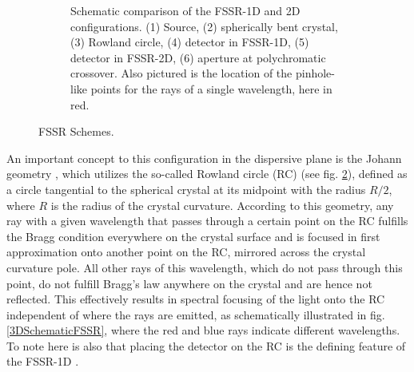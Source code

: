 \begin{figure}
\begin{subfigure}[t]{0.38\textwidth}
		\caption{Schematic comparison of the FSSR-1D and 2D configurations. (1) 
		Source, (2) 
		spherically bent crystal, (3) Rowland circle, (4) detector in FSSR-1D, 
		(5) detector in 
		FSSR-2D, (6) aperture at polychromatic crossover. Also pictured is the 
		location of the 
		pinhole-like points for the rays of a single 
		wavelength, here in red.}
		\label{FSSRComparison}
	\end{subfigure}
	\caption{FSSR Schemes.}
	\label{FSSRSchemes}
\end{figure}


An important concept to this configuration in the dispersive plane is the Johann 
geometry 
\citep{johann1931erzeugung}, which utilizes the so-called
Rowland circle (RC) (see fig. \ref{FSSRSchemes}), defined as a circle 
tangential to the spherical 
crystal at its midpoint with the radius $R/2$, where $R$ is the radius of the 
crystal 
curvature.  According to this geometry, any ray with a given wavelength that 
passes 
through a certain point on the RC fulfills the Bragg condition everywhere on 
the crystal surface and is focused in first approximation onto 
another point on the RC, mirrored across the crystal curvature pole. All other 
rays of this wavelength, which do not pass through this point, do not fulfill 
Bragg's law anywhere on the crystal and are hence not 
reflected. This effectively results in spectral focusing of the light onto the 
RC independent of where the rays are emitted, as schematically illustrated 
in fig. 
\ref{3DSchematicFSSR}, where the red and blue rays indicate different 
wavelengths. To note here is 
also that placing the detector on the RC is the defining feature of the FSSR-1D 
\citep{monot2002high}.

